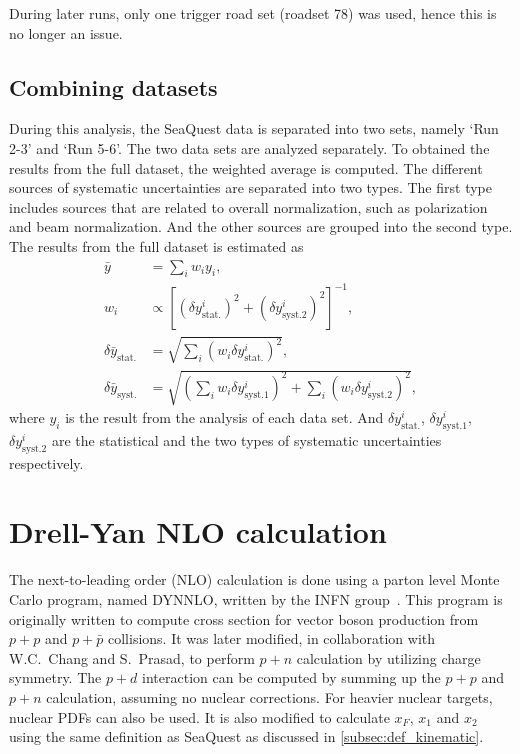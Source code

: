 \documentclass[../main.tex]{subfiles}
\begin{document}
During later runs, only one trigger road set (roadset 78) was used, hence this is no
longer an issue.

\subsection{Combining datasets}
\label{subsec:combine}
During this analysis, the SeaQuest data is separated into two sets, namely `Run 2-3' and `Run 5-6'.
The two data sets are analyzed separately. To obtained the results from the full dataset, the weighted
average is computed. The different sources of systematic uncertainties are separated into two types.
The first type includes sources that are related to overall normalization, such as polarization and beam
normalization. And the other sources are grouped into the second type. The results from the full dataset
is estimated as 
\begin{equation}
	\begin{split}
		\bar{y}&=\sum_i w_i y_i,\\
		w_i &\propto \left[\left(\delta y^i_{\mathrm{stat.}}\right)^2+\left(\delta y^i_{\mathrm{syst. 2}}\right)^2\right]^{-1},\\
		\delta\bar{y}_{\mathrm{stat.}}&=\sqrt{\sum_i \left(w_i \delta y^i_{\mathrm{stat.}}\right)^2},\\
		\delta\bar{y}_{\mathrm{syst.}}&=\sqrt{\left(\sum_i w_i \delta y^i_{\mathrm{syst. 1}}\right)^2+\sum_i \left(w_i \delta y^i_{\mathrm{syst. 2}}\right)^2},
	\end{split}
\end{equation}
where $y_i$ is the result from the analysis of each data set.
And $\delta y^i_{\mathrm{stat.}}$, $\delta y^i_{\mathrm{syst. 1}}$, $\delta y^i_{\mathrm{syst. 2}}$
are the statistical and the two types of systematic uncertainties respectively.

\section{Drell-Yan NLO calculation}
\label{sec:DYNNLO}
The next-to-leading order (NLO) calculation is done using a parton level Monte
Carlo program, named DYNNLO, written by the INFN group~\cite{catani2009,catani2007}. This program
is originally written to compute cross section for vector boson
production from $p+p$ and $p+\bar{p}$ collisions. It was later modified, in
collaboration with W.C.~Chang and S.~Prasad, to perform $p+n$ calculation
by utilizing charge symmetry. The $p+d$ interaction can be computed by summing up
the $p+p$ and $p+n$ calculation, assuming no nuclear corrections. For heavier nuclear
targets, nuclear PDFs can also be used. It is also modified to calculate $x_F$, $x_1$ and $x_2$
using the same definition as SeaQuest as discussed in \cref{subsec:def_kinematic}.
\end{document}

